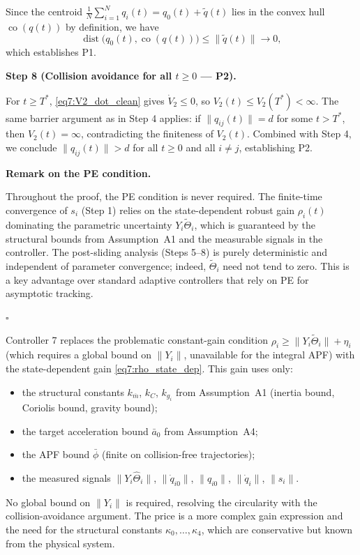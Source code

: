 Since the centroid $\frac1N\sum_{i=1}^N q_i(t) = q_0(t) + \tilde{q}(t)$ lies in the convex hull
$\operatorname{co}(q(t))$ by definition, we have
\begin{equation}
	\operatorname{dist}\bigl(q_0(t), \operatorname{co}(q(t))\bigr)
	\le \|\tilde{q}(t)\| \to 0,
\end{equation}
which establishes P1.

\medskip\noindent\textbf{Step 8 (Collision avoidance for all $t \ge 0$ --- P2).}

For $t \ge T^*$, \eqref{eq7:V2_dot_clean} gives $\dot{V}_2 \le 0$, so
$V_2(t) \le V_2(T^*) < \infty$.  The same barrier argument as in Step 4 applies:
if $\|q_{ij}(t)\| = d$ for some $t > T^*$, then $V_2(t) = \infty$, contradicting the
finiteness of $V_2(t)$.  Combined with Step 4, we conclude $\|q_{ij}(t)\| > d$ for all
$t \ge 0$ and all $i \neq j$, establishing P2.

\medskip\noindent\textbf{Remark on the PE condition.}

Throughout the proof, the PE condition is never required.  The finite-time convergence of
$s_i$ (Step 1) relies on the state-dependent robust gain $\rho_i(t)$ dominating the
parametric uncertainty $Y_i\tilde{\Theta}_i$, which is guaranteed by the structural bounds
from Assumption~A1 and the measurable signals in the controller.  The post-sliding analysis
(Steps 5--8) is purely deterministic and independent of parameter convergence; indeed,
$\tilde{\Theta}_i$ need not tend to zero.  This is a key advantage over standard adaptive
controllers that rely on PE for asymptotic tracking.

\hfill$\square$

\begin{remark}
	Controller 7 replaces the problematic constant-gain condition
	$\rho_i \ge \|Y_i\tilde{\Theta}_i\| + \eta_i$ (which requires a global bound on $\|Y_i\|$,
	unavailable for the integral APF) with the state-dependent gain
	\eqref{eq7:rho_state_dep}.  This gain uses only:
	\begin{itemize}
		\item the structural constants $k_{\overline m}$, $k_C$, $k_{g_i}$ from
			Assumption~A1 (inertia bound, Coriolis bound, gravity bound);
		\item the target acceleration bound $\bar{a}_0$ from Assumption~A4;
		\item the APF bound $\bar{\phi}$ (finite on collision-free trajectories);
		\item the measured signals $\|Y_i\hat{\Theta}_i\|$, $\|\dot{q}_{i0}\|$,
			$\|q_{i0}\|$, $\|\dot{q}_i\|$, $\|s_i\|$.
	\end{itemize}
	No global bound on $\|Y_i\|$ is required, resolving the circularity with the
	collision-avoidance argument.  The price is a more complex gain expression and the
	need for the structural constants $\kappa_0,\dots,\kappa_4$, which are conservative
	but known from the physical system.
\end{remark}